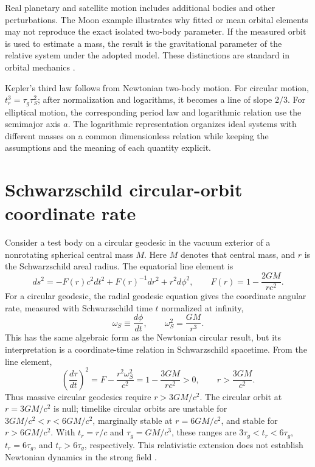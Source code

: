 \documentclass[12pt]{article}
\begin{document}
Real planetary and satellite motion includes additional bodies and other perturbations. The Moon example illustrates why fitted or mean orbital elements may not reproduce the exact isolated two-body parameter. If the measured orbit is used to estimate a mass, the result is the gravitational parameter of the relative system under the adopted model. These distinctions are standard in orbital mechanics \cite{OpenStaxKepler}.

Kepler's third law follows from Newtonian two-body motion. For circular motion, $t_r^3=\tau_g\tau_S^2$; after normalization and logarithms, it becomes a line of slope $2/3$. For elliptical motion, the corresponding period law and logarithmic relation use the semimajor axis $a$. The logarithmic representation organizes ideal systems with different masses on a common dimensionless relation while keeping the assumptions and the meaning of each quantity explicit.

\appendix

\section{Schwarzschild circular-orbit coordinate rate}
\label{app:schwarzschild}

Consider a test body on a circular geodesic in the vacuum exterior of a nonrotating spherical central mass $M$. Here $M$ denotes that central mass, and $r$ is the Schwarzschild areal radius. The equatorial line element is
\begin{equation}
  ds^2=-F(r)c^2dt^2+F(r)^{-1}dr^2+r^2d\phi^2,
  \qquad
  F(r)=1-\frac{2GM}{rc^2}.
  \label{eq:schwarzschild-line-element}
\end{equation}
For a circular geodesic, the radial geodesic equation gives the coordinate angular rate, measured with Schwarzschild time $t$ normalized at infinity,
\begin{equation}
  \omega_S\equiv\frac{d\phi}{dt},
  \qquad
  \omega_S^2=\frac{GM}{r^3}.
  \label{eq:schwarzschild-rate}
\end{equation}
This has the same algebraic form as the Newtonian circular result, but its interpretation is a coordinate-time relation in Schwarzschild spacetime. From the line element,
\begin{equation}
  \left(\frac{d\tau}{dt}\right)^2
  =F-\frac{r^2\omega_S^2}{c^2}
  =1-\frac{3GM}{rc^2}>0,
  \qquad
  r>\frac{3GM}{c^2}.
  \label{eq:timelike-orbit-domain}
\end{equation}
Thus massive circular geodesics require $r>3GM/c^2$. The circular orbit at $r=3GM/c^2$ is null; timelike circular orbits are unstable for $3GM/c^2<r<6GM/c^2$, marginally stable at $r=6GM/c^2$, and stable for $r>6GM/c^2$. With $t_r=r/c$ and $\tau_g=GM/c^3$, these ranges are $3\tau_g<t_r<6\tau_g$, $t_r=6\tau_g$, and $t_r>6\tau_g$, respectively. This relativistic extension does not establish Newtonian dynamics in the strong field \cite{TongGR}.
\end{document}
